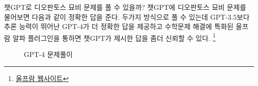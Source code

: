 \documentclass[
  letterpaper,
]{book}
\begin{document}
챗GPT로 디오판토스 묘비 문제를 풀 수 있을까? 챗GPT에 디오판토스 묘비
문제를 물어보면 다음과 같이 정확한 답을 준다. 두가지 방식으로 풀 수
있는데 GPT-3.5보다 추론 능력이 뛰어난 GPT-4가 더 정확한 답을 제공하고
수학문제 해결에 특화된 울프람 알파 플러그인을 통하면 챗GPT가 제시한 답을
좀더 신뢰할 수 있다. \footnote{\href{https://www.wolframalpha.com/input?i=x\%2F6+\%2B+x\%2F12+\%2B+x\%2F7+\%2B+5+\%2B+x\%2F2+\%2B+4+\%3D+x}{울프람
  웹사이트}}

\begin{figure}

\begin{minipage}[t]{0.50\linewidth}

{\centering 


\caption{GPT-4 문제풀이}

}

\end{minipage}%
%
\begin{minipage}[t]{0.50\linewidth}

{\centering 

\raisebox{-\height}{

}}
\end{minipage}
\end{figure}
\end{document}
